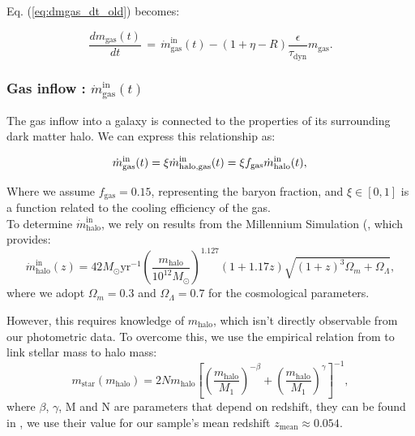 \documentclass[fleqn,usenatbib]{mnras}
\begin{document}
Eq. (\ref{eq:dmgas_dt_old}) becomes:

\begin{equation}
    \dfrac{dm_\text{gas}(t)}{dt} \, = \, \dot{m}_\text{gas}^\text{in}(t) - \left(1+\eta-R\right) \dfrac{\epsilon}{\tau_\text{dyn}} m_\text{gas}.
	\label{eq:dmgas_dt}
\end{equation}


\subsubsection{\textbf{Gas inflow : $\dot{m}_\text{gas}^\text{in}(t)$}}

The gas inflow into a galaxy is connected to the properties of its surrounding dark matter halo. We can express this relationship as:

\begin{equation}
\dot{m}_\text{gas}^\text{in}(t) = \xi \dot{m}_\text{halo,\rm gas}^\text{in}(t) = \xi f_\text{gas} \dot{m}_\text{halo}^\text{in}(t),\\
\label{eq:mgas_inflow}
\end{equation}

Where we assume $f_\text{gas}=0.15$, representing the baryon fraction, and $\xi \in [0,1]$ is a function related to the cooling efficiency of the gas.\\
To determine $\dot{m}_\text{halo}^\text{in}$, we rely on results from the Millennium Simulation (\cite{10.1111/j.1365-2966.2009.15329.x}, which provides:
{\fontsize{7.9pt}{7.9pt}\begin{equation}
\dot{m}_\text{halo}^\text{in}(z) = 42 M_{\odot} \text{yr}^{-1} \left(\dfrac{m_\text{halo}}{10^{12}M_{\odot}}\right)^{1.127} (1+1.17z) \sqrt{(1+z)^3 \Omega_m + \Omega_\Lambda},
\label{eq:mcbride}
\end{equation}}
where we adopt $\Omega_m=0.3$ and $\Omega_\Lambda=0.7$ for the cosmological parameters.

However, this requires knowledge of $m_\text{halo}$, which isn't directly observable from our photometric data. To overcome this, we use the empirical relation from \cite{moster_2012} to link stellar mass to halo mass:
{\fontsize{9pt}{9pt}\begin{equation}
m_\text{star} \left(m_\text{halo}\right) = 2N m_\text{halo} \left[\left(\dfrac{m_\text{halo}}{M_1}\right)^{-\beta} + \left(\dfrac{m_\text{halo}}{M_1}\right)^\gamma\right]^{-1},
\label{eq:moster}
\end{equation}}
where $\beta$, $\gamma$, M and N are parameters that depend on redshift, they can be found in \cite{moster_2012}, we use their value for our sample's mean redshift $z_{\text{mean}} \approx 0.054$.\\
\end{document}
